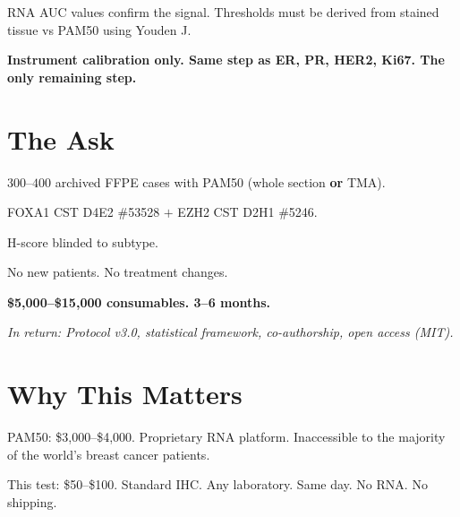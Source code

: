 \documentclass[9pt, a4paper]{article}
\begin{document}
\begin{multicols}{3}
\begin{mdframed}
{RNA AUC values confirm the signal.
Thresholds must be derived from stained
tissue vs PAM50 using Youden J.

\textbf{Instrument calibration only.
Same step as ER, PR, HER2, Ki67.
The only remaining step.}}
\end{mdframed}

\columnbreak

\section{The Ask}

\begin{mdframed}[backgroundcolor=askbox,
                 linecolor=green!50!black,
                 linewidth=0.6pt,
                 innertopmargin=2pt,
                 innerbottommargin=2pt,
                 innerleftmargin=4pt,
                 innerrightmargin=4pt,
                 skipabove=0pt,
                 skipbelow=2pt]
{\small
$300$--$400$ archived FFPE cases with
PAM50 (whole section \textbf{or} TMA).

FOXA1 CST D4E2 \#53528 $+$
EZH2 CST D2H1 \#5246.

H-score blinded to subtype.

No new patients.
No treatment changes.

\textbf{\$5,000--\$15,000 consumables.
3--6 months.}

\smallskip
\textit{In return: Protocol v3.0,
statistical framework,
co-authorship, open access (MIT).}}
\end{mdframed}

\section{Why This Matters}

\begin{mdframed}[backgroundcolor=equitybox,
                 linecolor=orange!50!black,
                 linewidth=0.6pt,
                 innertopmargin=2pt,
                 innerbottommargin=2pt,
                 innerleftmargin=4pt,
                 innerrightmargin=4pt,
                 skipabove=0pt,
                 skipbelow=2pt]
{\small
PAM50: \$3,000--\$4,000.
Proprietary RNA platform.
Inaccessible to the majority
of the world's breast cancer patients.

\smallskip
This test: \$50--\$100.
Standard IHC. Any laboratory.
Same day. No RNA. No shipping.

}
\end{mdframed}
\end{multicols}
\end{document}
